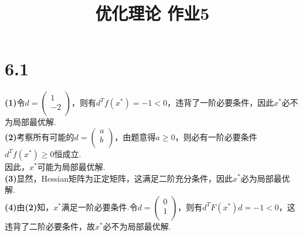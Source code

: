 \documentclass{article}
\title{优化理论 作业5}
\author{}
\date{}
\begin{document}
\section*{6.1}
\noindent
\textbf{(1)}令$d=\left(
    \begin{array}{c}
        1 \\
        -2 \\
    \end{array}
\right)$，则有$d^Tf(x^*)=-1<0$，违背了一阶必要条件，因此$x^*$必不为局部最优解.\\
\textbf{(2)}考察所有可能的$d=\left(
    \begin{array}{c}
        a \\
        b \\
    \end{array}
\right)$，由题意得$a\geq 0$，则必有一阶必要条件$d^Tf(x^*)\geq 0 $恒成立.\\
因此，$x^*$可能为局部最优解.\\
\textbf{(3)}显然，Hessian矩阵为正定矩阵，这满足二阶充分条件，因此$x^*$必为局部最优解.\\
\textbf{(4)}由\textbf{(2)}知，$x^*$满足一阶必要条件.令$d=\left(
    \begin{array}{c}
        0 \\
        1 \\
    \end{array}
\right)$，则有$d^TF(x^*)d=-1<0$，这违背了二阶必要条件，故$x^*$必不为局部最优解.
\end{document}
